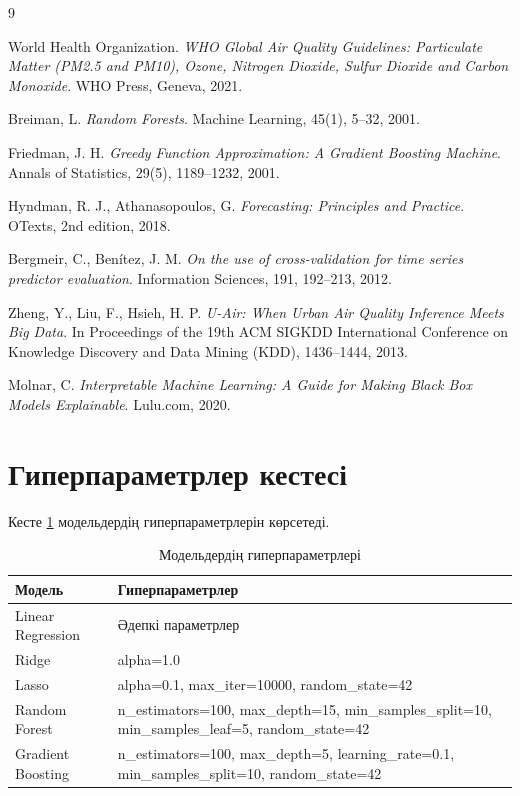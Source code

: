 \documentclass[12pt,a4paper]{article}
\begin{document}
\begin{thebibliography}{9}

World Health Organization.
\textit{WHO Global Air Quality Guidelines: Particulate Matter (PM2.5 and PM10), Ozone, Nitrogen Dioxide, Sulfur Dioxide and Carbon Monoxide}.
WHO Press, Geneva, 2021.

Breiman, L.
\textit{Random Forests}.
Machine Learning, 45(1), 5--32, 2001.

Friedman, J. H.
\textit{Greedy Function Approximation: A Gradient Boosting Machine}.
Annals of Statistics, 29(5), 1189--1232, 2001.

Hyndman, R. J., Athanasopoulos, G.
\textit{Forecasting: Principles and Practice}.
OTexts, 2nd edition, 2018.

Bergmeir, C., Benítez, J. M.
\textit{On the use of cross-validation for time series predictor evaluation}.
Information Sciences, 191, 192--213, 2012.

Zheng, Y., Liu, F., Hsieh, H. P.
\textit{U-Air: When Urban Air Quality Inference Meets Big Data}.
In Proceedings of the 19th ACM SIGKDD International Conference on Knowledge Discovery and Data Mining (KDD), 1436--1444, 2013.

Molnar, C.
\textit{Interpretable Machine Learning: A Guide for Making Black Box Models Explainable}.
Lulu.com, 2020.

\end{thebibliography}

\newpage
\appendix

\section{Гиперпараметрлер кестесі}

Кесте \ref{tab:hyperparameters} модельдердің гиперпараметрлерін көрсетеді.

\begin{table}[H]
\centering
\caption{Модельдердің гиперпараметрлері}
\label{tab:hyperparameters}
\begin{tabular}{lp{10cm}}
\toprule
\textbf{Модель} & \textbf{Гиперпараметрлер} \\
\midrule
Linear Regression & Әдепкі параметрлер \\
Ridge & alpha=1.0 \\
Lasso & alpha=0.1, max\_iter=10000, random\_state=42 \\
Random Forest & n\_estimators=100, max\_depth=15, min\_samples\_split=10, min\_samples\_leaf=5, random\_state=42 \\
Gradient Boosting & n\_estimators=100, max\_depth=5, learning\_rate=0.1, min\_samples\_split=10, random\_state=42 \\
\bottomrule
\end{tabular}
\end{table}
\end{document}
